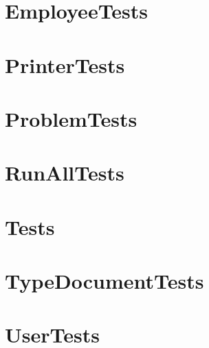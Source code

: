 \documentclass{article}
\begin{document}
\section{EmployeeTests}

\section{PrinterTests}

\section{ProblemTests}

\section{RunAllTests}

\section{Tests}

\section{TypeDocumentTests}

\section{UserTests}

\end{document}
